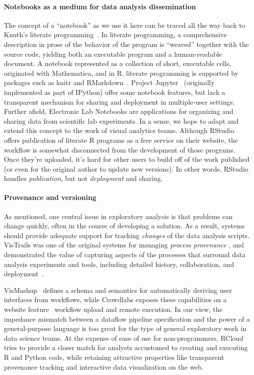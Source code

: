 \paragraph*{Notebooks as a medium for data analysis dissemination}
The concept of a ``notebook'' as we use it here can be traced all the
way back to Knuth's literate programming~\cite{Knuth:1984:LP}. In
literate programming, a comprehensive description in prose of the
behavior of the program is ``weaved'' together with the source code,
yielding both an executable program and a human-readable document.
A notebook represented as a collection of short, executable cells,
originated with Mathematica, and in R, literate programming is
supported by packages such as knitr and RMarkdown~\cite{Xie:2013:DDW}.
Project Jupyter~\cite{jupyter} (originally implemented as part of
IPython) offer some notebook features, but lack a transparent
mechanism for sharing and deployment in multiple-user settings.
%
Further afield, {Electronic Lab Notebooks} are applications for organizing
and sharing data from scientific lab experiments\cite{Rubacha:2011:ELN}.
In a sense, we hope to adapt and extend this concept to the work of
visual analytics teams.
%
Although RStudio offers publication of literate R programs as a free
service on their website, the workflow is somewhat disconnected from
the development of those programs. Once they're uploaded, it's hard
for other users to build off of the work published (or even for the
original author to update new versions). In other words, RStudio
handles \emph{publication}, but not \emph{deployment} and sharing.

\paragraph*{Provenance and versioning} As
mentioned, one central issue in exploratory analysis is that
problems can change quickly, often in the course of developing a
solution. As a result, systems should provide adequate support for
tracking \emph{changes} of the data analysis scripts. VisTrails was
one of the original systems for managing \emph{process provenance} ,
and demonstrated the value of capturing aspects of the processes that
surround data analysis experiments and tools, including detailed
history, collaboration, and deployment~\cite{Callahan:2006:VVM}.

VisMashup~\cite{Santos:2009:VST} defines a schema and
semantics for automatically deriving user interfaces from workflows,
while Crowdlabs exposes these capabilities on a website
feature~\cite{Mates:2011:CSA} workflow upload and remote execution. In
our view, the impedance mismatch between a dataflow pipeline
specification and the power of a general-purpose language is too great
for the type of general exploratory work in data science teams. At the
expense of ease of use for non-programmers, RCloud tries to provide a
closer match for analysts accustomed to creating and executing R and
Python code, while retaining attractive properties like transparent
provenance tracking and interactive data visualization on the web.

